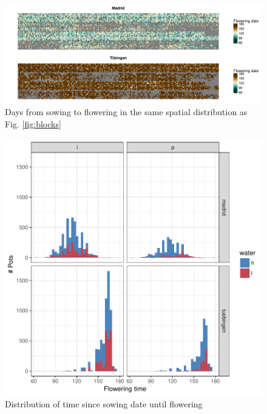 \documentclass[12pt,]{article}
\begin{document}
\begin{figure}
    \centerline{\includegraphics[width=6in]{../figs/Figure_raw_flowering.pdf}}
    \caption{ Days from sowing to flowering in the same spatial distribution as Fig. \ref{fig:blocks}}
    \label{fig:flowerraw}
\end{figure}

\begin{figure}
    \centerline{\includegraphics[width=5in]{../figs/Figure_flowering_distribution}}
    \caption{ Distribution of time since sowing date until flowering}
    \label{fig:flowerdistribution}
\end{figure}
\end{document}
